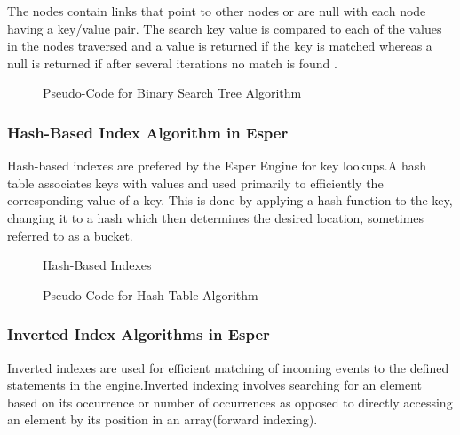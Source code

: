 \noindent The nodes contain links that point to other nodes or are null with each node having a key/value pair. The search key value is compared to each of the values in the nodes traversed and a value is returned if the key is matched whereas  a null is returned if after several iterations no match is found \cite{twentyeight}.
\newpage

\begin{center}
\begin{figure}[h]
\caption{Pseudo-Code for Binary Search Tree Algorithm \cite{thirty}}

\end{figure}
\end{center}

\subsubsection{Hash-Based Index Algorithm in Esper}

\noindent Hash-based indexes are prefered by the Esper Engine for key lookups.A hash table \cite{twentyeight} associates keys with values and used primarily to efficiently the corresponding value of a key. This is done by applying a hash function to the key, changing it to a hash which then determines the desired location, sometimes referred to as a bucket.
\newpage
\begin{center}
\begin{figure}[h]
\caption{Hash-Based Indexes\cite{twentyeight}}

\end{figure}
\end{center}

\begin{center}
\begin{figure}[h]
\caption{Pseudo-Code for Hash Table Algorithm \cite{thirtyone}}

\end{figure}
\end{center}
\newpage

\subsubsection{Inverted Index Algorithms in Esper}

\noindent Inverted indexes are used for efficient matching of incoming events to the defined statements in the engine.Inverted indexing involves searching for an element based on its occurrence or number  of occurrences as opposed to directly accessing an element by its position in an array(forward indexing).

